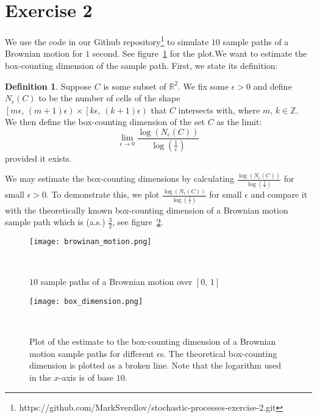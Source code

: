 \documentclass{amsart}
\theoremstyle{plain}
\theoremstyle{definition}
\newtheorem{definition}{Definition}
\theoremstyle{definition}
\theoremstyle{remark}
\begin{document}
\section{Exercise 2}
We use the code in our Github repository\footnote{https://github.com/MarkSverdlov/stochastic-processes-exercise-2.git} to simulate \(10\) sample paths of a Brownian motion for \(1\) second. See figure~\ref{fig:brownian-motion} for the plot.We want to estimate the box-counting dimension of the sample path. First, we state its definition:
\begin{definition}
    Suppose \(C\) is some subset of \(\mathbb{R}^{2}\). We fix some \(\epsilon>0\) and define \(N_{\epsilon}\left(C\right)\) to be the number of cells of the shape \(\left[m \epsilon,\,\left(m+1\right) \epsilon\right) \times \left[k \epsilon,\,\left(k+1\right) \epsilon\right)\) that \(C\) intersects with, where \(m,\,k \in \mathbb{Z}\). We then define the box-counting dimension of the set \(C\) as the limit:
    \begin{equation*}
        \lim_{\epsilon\rightarrow 0} \frac{\log \left(N_{\epsilon}\left(C\right)\right)}{\log \left(\frac{1}{\epsilon}\right)}
    \end{equation*}
    provided it exists.
\end{definition}

We may estimate the box-counting dimensions by calculating \(\frac{\log \left(N_{\epsilon}\left(C\right)\right)}{\log \left(\frac{1}{\epsilon}\right)}
\) for small \(\epsilon >0\). To demonstrate this, we plot \(\frac{\log \left(N_{\epsilon}\left(C\right)\right)}{\log \left(\frac{1}{\epsilon}\right)}
\) for small \(\epsilon\) and compare it with the theoretically known box-counting dimension of a Brownian motion sample path which is (a.s.) \(\frac{3}{2}\), see figure~\ref{fig:box-dim}.

\begin{figure}
    \texttt{[image: browinan\_motion.png]}
    \caption{\(10\) sample paths of a Brownian motion over \(\left[0,\,1\right]\)}~\label{fig:brownian-motion}
\end{figure}

\begin{figure}
    \texttt{[image: box\_dimension.png]}
\caption{Plot of the estimate to the box-counting dimension of a Brownian motion sample paths for different \(\epsilon\)s. The theoretical box-counting dimension is plotted as a broken line. Note that the logarithm used in the \(x\)-axis is of base \(10\).}~\label{fig:box-dim}
\end{figure}
\end{document}
